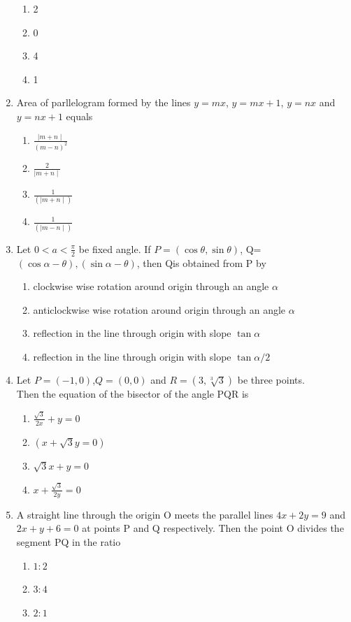 \documentclass[12pt]{article}
\begin{document}
\begin{enumerate}
\begin{enumerate}
\item  2 
 \item 0 
 \item  4   
 \item  1
 \end{enumerate}
\item  Area of parllelogram formed by the lines $y=mx$, $y=mx+1$,  $y=nx$ and  $y=nx+1$ equals
\begin{enumerate}
\item $\frac{\mid m+n\mid}{(m-n)^2}$
\item $\frac{2}{\mid m+n \mid}$
\item $\frac{1}{(\mid m+n \mid)}$
\item $\frac{1}{(\mid m-n\mid)}$
\end{enumerate}
 \item Let $0<a<\frac{\pi}{2}$ be fixed angle. If $P=(\cos\theta,\sin\theta)$, Q=$(\cos\alpha-\theta),(\sin\alpha-\theta)$, then Qis obtained from P by
 \begin{enumerate}
\item  clockwise wise rotation around origin through an angle $\alpha$
\item anticlockwise wise rotation around origin through an angle $\alpha$
\item reflection in the line through origin with slope $\tan\alpha$
\item reflection in the line through origin with slope $\tan\alpha/2$
\end{enumerate}
\item Let $P=(-1,0)$,$Q=(0,0)$ and $R=(3,\sqrt[3]{3})$ be three points.\\
Then the equation of the bisector of the angle PQR is
\begin{enumerate}
\item  $\frac{\sqrt{3}}{2x}+y=0$ 
\item  $(x+\sqrt{3}y=0)$
\item  $\sqrt{3}x+y=0$ 
\item $x+\frac{\sqrt{3}}{2y}=0$
\end{enumerate}
\item A straight line through the origin O meets the parallel lines $4x+2y=9$ and $2x+y+6=0$ at points P and Q respectively. Then the point O divides the segment PQ in the ratio
\begin{enumerate}
\item $1:2$   
\item$3:4$
\item  $2:1$ 

\end{enumerate}
\end{enumerate}
\end{document}
